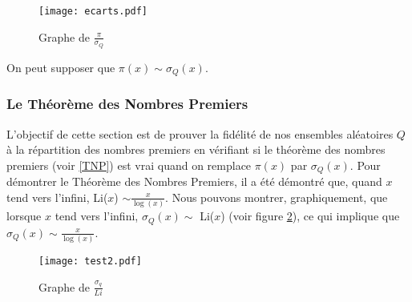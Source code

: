 \documentclass[../main.tex]{report}
\begin{document}
\begin{figure}[H]
 \centering
 \texttt{[image: ecarts.pdf]}
 \caption{Graphe de $\frac{\pi}{\sigma_{Q}}$ }
 \label{im:image2}
 \end{figure}
On peut supposer que $ \pi(x) \sim \sigma_{Q}(x) $.


\subsubsection{Le Théorème des Nombres Premiers}

L'objectif de cette section est de prouver la fidélité de nos ensembles aléatoires $Q$ à la répartition des nombres premiers en vérifiant si le théorème des nombres premiers (voir \ref{TNP}) est vrai quand on remplace $\pi(x)$ par $\sigma_{Q}(x)$. 
Pour démontrer le Théorème des Nombres Premiers, il a été démontré que, quand $x$ tend vers l'infini, Li($x$) $ \sim \frac{x}{\log(x)} $. Nous pouvons montrer, graphiquement, que lorsque $x$ tend vers l'infini, $ \sigma_{Q}(x) \sim $ Li($x$)  (voir figure \ref{im:image3}), ce qui implique que $ \sigma_{Q}(x) \sim \frac{x}{\log(x)} $.

\begin{figure}[H]
 \centering
 \texttt{[image: test2.pdf]}
 \caption{Graphe de $\frac{\sigma_{q}}{Li}$}
 \label{im:image3}
 \end{figure}
\end{document}
